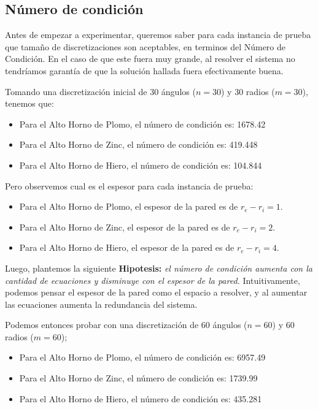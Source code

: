 \subsection{Número de condición}

Antes de empezar a experimentar, queremos saber para cada instancia de prueba que tamaño de discretizaciones son aceptables, en terminos del Número de Condición.
En el caso de que este fuera muy grande, al resolver el sistema no tendríamos garantía de que la solución hallada fuera efectivamente buena.

Tomando una discretización inicial de 30 ángulos ($n = 30$) y 30 radios ($m = 30$), tenemos que:
\begin{itemize}
    \item Para el Alto Horno de Plomo, el número de condición es: 1678.42
    \item Para el Alto Horno de Zinc, el número de condición es: 419.448
    \item Para el Alto Horno de Hiero, el número de condición es: 104.844
\end{itemize}

Pero observemos cual es el espesor para cada instancia de prueba:
\begin{itemize}
    \item Para el Alto Horno de Plomo, el espesor de la pared es de $r_e - r_i = 1$.
    \item Para el Alto Horno de Zinc, el espesor de la pared es de $r_e - r_i = 2$.
    \item Para el Alto Horno de Hiero, el espesor de la pared es de $r_e - r_i = 4$.
\end{itemize}

Luego, plantemos la siguiente \textbf{Hipotesis:} \textit{el número de condición aumenta con la cantidad de ecuaciones y disminuye con el espesor de la pared.} Intuitivamente, podemos pensar el espesor de la pared como el espacio a resolver, y al aumentar las ecuaciones aumenta la redundancia del sistema.

Podemos entonces probar con una discretización de 60 ángulos ($n = 60$) y 60 radios ($m = 60$);
\begin{itemize}
    \item Para el Alto Horno de Plomo, el número de condición es: 6957.49
    \item Para el Alto Horno de Zinc, el número de condición es: 1739.99
    \item Para el Alto Horno de Hiero, el número de condición es: 435.281
\end{itemize}

